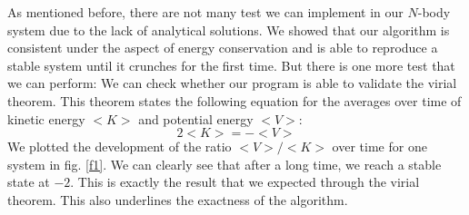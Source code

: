 \documentclass[10pt,a4paper]{article}
\begin{document}
As mentioned before, there are not many test we can implement in our $N$-body system due to the lack of analytical solutions. We showed that our algorithm is consistent under the aspect of energy conservation and is able to reproduce a stable system until it crunches for the first time. But there is one more test that we can perform: We can check whether our program is able to validate the virial theorem. This theorem states the following equation for the averages over time of kinetic energy $<K>$ and potential energy $<V>$:
\begin{equation}
2<K>=-<V>
\end{equation}
We plotted the development of the ratio $<V>/<K>$ over time for one system in fig. \ref{f1}. We can clearly see that after a long time, we reach a stable state at $-2$. This is exactly the result that we expected through the virial theorem. This also underlines the exactness of the algorithm.
\end{document}
